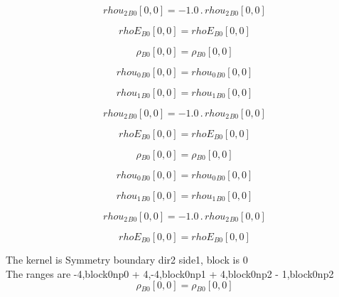\documentclass{article}
\begin{document}
\begin{dmath}{rhou_{2}{_{B0}}}[{0,0}] = - 1.0 \,.\, {rhou_{2}{_{B0}}}[{0,0}]\end{dmath}

\begin{dmath}{rhoE{_{B0}}}[{0,0}] = {rhoE{_{B0}}}[{0,0}]\end{dmath}

\begin{dmath}{\rho{_{B0}}}[{0,0}] = {\rho{_{B0}}}[{0,0}]\end{dmath}

\begin{dmath}{rhou_{0}{_{B0}}}[{0,0}] = {rhou_{0}{_{B0}}}[{0,0}]\end{dmath}

\begin{dmath}{rhou_{1}{_{B0}}}[{0,0}] = {rhou_{1}{_{B0}}}[{0,0}]\end{dmath}

\begin{dmath}{rhou_{2}{_{B0}}}[{0,0}] = - 1.0 \,.\, {rhou_{2}{_{B0}}}[{0,0}]\end{dmath}

\begin{dmath}{rhoE{_{B0}}}[{0,0}] = {rhoE{_{B0}}}[{0,0}]\end{dmath}

\begin{dmath}{\rho{_{B0}}}[{0,0}] = {\rho{_{B0}}}[{0,0}]\end{dmath}

\begin{dmath}{rhou_{0}{_{B0}}}[{0,0}] = {rhou_{0}{_{B0}}}[{0,0}]\end{dmath}

\begin{dmath}{rhou_{1}{_{B0}}}[{0,0}] = {rhou_{1}{_{B0}}}[{0,0}]\end{dmath}

\begin{dmath}{rhou_{2}{_{B0}}}[{0,0}] = - 1.0 \,.\, {rhou_{2}{_{B0}}}[{0,0}]\end{dmath}

\begin{dmath}{rhoE{_{B0}}}[{0,0}] = {rhoE{_{B0}}}[{0,0}]\end{dmath}

\noindent The kernel is Symmetry boundary dir2 side1, block is 0\\\noindent The ranges are -4,block0np0 + 4,-4,block0np1 + 4,block0np2 - 1,block0np2\\\begin{dmath}{\rho{_{B0}}}[{0,0}] = {\rho{_{B0}}}[{0,0}]\end{dmath}
\end{document}
